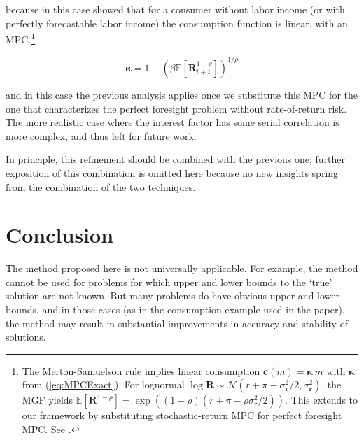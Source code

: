 \documentclass[preprint,authoryear]{elsarticle}
\newcommand{\Ex}{\mathbf{\mathbb{E}}}
\newcommand{\DiscFac}{\beta}
\newcommand{\CRRA}{\rho}
\newcommand{\mNrm}{m}
\newcommand{\cFunc}{\mathbf{c}}
\newcommand{\MPC}{\boldsymbol{\kappa}}
\newcommand{\Risky}{\mathbf{R}}
\newcommand{\Nrml}{\mathcal{N}}
\newcommand{\std}{\sigma}
\newcommand{\risky}{\mathbf{r}}
\newcommand{\equityPrem}{\pi}
\begin{document}
because in this case \citet{Samuelson1969, Merton1969, Merton1971}
showed that for a consumer without labor income (or with perfectly forecastable
labor income) the consumption function is linear, with an MPC.\footnote{The Merton-Samuelson rule implies linear consumption $\cFunc(\mNrm) = \MPC\,\mNrm$ with $\MPC$ from (\ref{eq:MPCExact}). For lognormal $\log \Risky \sim \Nrml(r+\equityPrem -\std_{\risky}^{2}/2,\std_{\risky}^{2})$, the MGF yields $\Ex[\Risky^{1 -\CRRA}] = \exp((1 -\CRRA)(r+\equityPrem - \CRRA\std_{\risky}^{2}/2))$. This extends to our framework by substituting stochastic-return MPC for perfect foresight MPC. See \citet{CRRA-RateRisk, BBZ2016SkewedWealth}.}

\begin{equation}
\label{eq:MPCExact}
\MPC = 1- \left(\DiscFac  \Ex[\Risky_{t+1}^{1-\CRRA}]\right)^{1/\CRRA}
\end{equation}

and in this case the previous analysis applies once we substitute this MPC for
the one that characterizes the perfect foresight problem without rate-of-return
risk. The more realistic case where the interest factor has some serial
correlation is more complex, and thus left for future work.

In principle, this refinement should be combined with the previous one; further
exposition of this combination is omitted here because no new insights spring
from the combination of the two techniques.

\section{Conclusion}

The method proposed here is not universally applicable. For example, the method
cannot be used for problems for which upper and lower bounds to the `true'
solution are not known. But many problems do have obvious upper and lower
bounds, and in those cases (as in the consumption example used in the paper),
the method may result in substantial improvements in accuracy and stability of
solutions.



\end{document}
